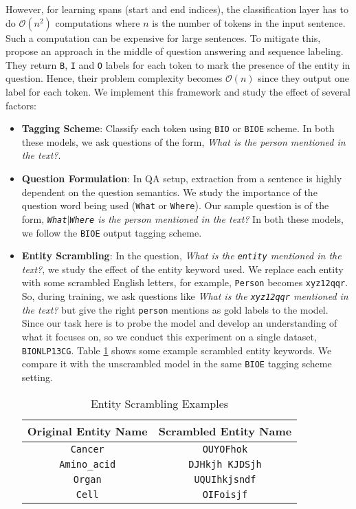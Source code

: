 However, for learning spans (start and end indices), the classification layer has to do $\mathcal{O}(n^2)$ computations where $n$ is the number of tokens in the input sentence. Such a computation can be expensive for large sentences. To mitigate this, \cite{banerjee2019knowledge} propose an approach in the middle of question answering and sequence labeling. They return \texttt{B}, \texttt{I} and \texttt{O} labels for each token to mark the presence of the entity in question. Hence, their problem complexity becomes $\mathcal{O}(n)$ since they output one label for each token. We implement this framework and study the effect of several factors:

\begin{itemize}
    \item \textbf{Tagging Scheme}: Classify each token using \texttt{BIO} or \texttt{BIOE} scheme. In both these models, we ask questions of the form, \textit{What is the person mentioned in the text?}.
    
    \item \textbf{Question Formulation}: In QA setup, extraction from a sentence is highly dependent on the question semantics. We study the importance of the question word being used (\texttt{What} or \texttt{Where}). Our sample question is of the form, \textit{\texttt{What}$\vert$\texttt{Where} is the person mentioned in the text?} In both these models, we follow the \texttt{BIOE} output tagging scheme.
    
    \item \textbf{Entity Scrambling}: In the question, \textit{What is the \texttt{entity} mentioned in the text?}, we study the effect of the entity keyword used. We replace each entity with some scrambled English letters, for example, \texttt{Person} becomes \texttt{xyz12qqr}. So, during training, we ask questions like \textit{What is the \texttt{xyz12qqr} mentioned in the text?} but give the right \texttt{person} mentions as gold labels to the model. Since our task here is to probe the model and develop an understanding of what it focuses on, so we conduct this experiment on a single dataset, \texttt{BIONLP13CG}. Table \ref{tab:entity_scramble_bio} shows some example scrambled entity keywords. We compare it with the unscrambled model in the same \texttt{BIOE} tagging scheme setting.
    
    \begin{table}[h!]
    \centering
    \begin{tabular}{|c|c|}\hline
    	\textbf{Original Entity Name} & \textbf{Scrambled Entity Name}\\\hline
    	\texttt{Cancer} & \texttt{OUYOFhok}\\\hline
    	\texttt{Amino\_acid} & \texttt{DJHkjh KJDSjh}\\\hline
    	\texttt{Organ} & \texttt{UQUIhkjsndf}\\\hline
    	\texttt{Cell} & \texttt{OIFoisjf}\\\hline
    	\end{tabular}
        \caption{Entity Scrambling Examples}
        \label{tab:entity_scramble_bio}
    \end{table}
\end{itemize}

